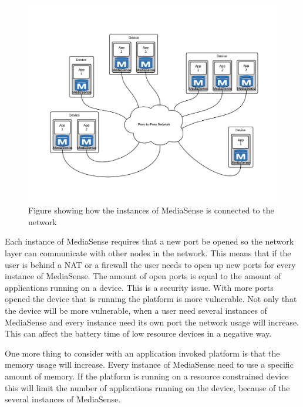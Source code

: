 \begin{figure}[t]
	\centering
    	\includegraphics[scale=0.25]{part_2/mediasense/several_nodes_on_one_device.png}
		\caption{Figure showing how the instances of MediaSense is connected to the network} 
\end{figure}

Each instance of MediaSense requires that a new port be opened so the network layer can communicate with other nodes in the network. This means that if the user is behind a NAT or a firewall the user needs to open up new ports for every instance of MediaSense. The amount of open ports is equal to the amount of applications running on a device. This is a security issue. With more ports opened the device that is running the platform is more vulnerable. Not only that the device will be more vulnerable, when a user need several instances of MediaSense and every instance need its own port the network usage will increase. This can affect the battery time of low resource devices in a negative way.

One more thing to consider with an application invoked platform is that the memory usage will increase. Every instance of MediaSense need to use a specific amount of memory. If the platform is running on a resource constrained device this will limit the number of applications running on the device, because of the several instances of MediaSense.

